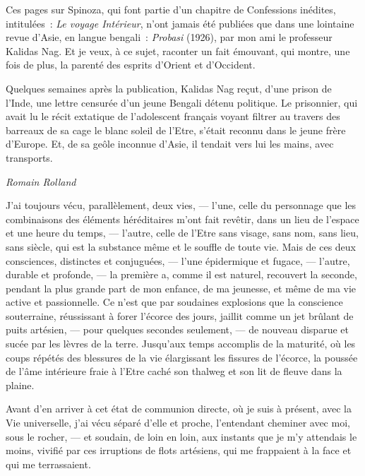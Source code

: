 

Ces pages sur Spinoza, qui font partie d'un chapitre de Confessions
inédites, intitulées~: \emph{Le voyage Intérieur}, n'ont jamais été
publiées que dans une lointaine revue d'Asie, en langue bengali~:
\emph{Probasi} (1926), par mon ami le professeur Kalidas Nag. Et je
veux, à ce sujet, raconter un fait émouvant, qui montre, une fois de
plus, la parenté des esprits d'Orient et d'Occident.

Quelques semaines après la publication, Kalidas Nag reçut, d'une prison
de l'Inde, une lettre censurée d'un jeune Bengali détenu politique. Le
prisonnier, qui avait lu le récit extatique de l'adolescent français
voyant filtrer au travers des barreaux de sa cage le blanc soleil de
l'Etre, s'était reconnu dans le jeune frère d'Europe. Et, de sa geôle
inconnue d'Asie, il tendait vers lui les mains, avec transports.

\begin{flushright}
\emph{Romain Rolland}
\end{flushright}

\pagebreak
\thispagestyle{empty}
\movetooddpage

J'ai toujours vécu, parallèlement, deux vies, --- l'une, celle du
personnage que les combinaisons des éléments héréditaires m'ont fait
revêtir, dans un lieu de l'espace et une heure du temps, --- l'autre,
celle de l'Etre sans visage, sans nom, sans lieu, sans siècle, qui est
la substance même et le souffle de toute vie. Mais de ces deux
consciences, distinctes et conjuguées, --- l'une épidermique et fugace,
--- l'autre, durable et profonde, --- la première a, comme il est naturel,
recouvert la seconde, pendant la plus grande part de mon enfance, de ma
jeunesse, et même de ma vie active et passionnelle. Ce n'est que par
soudaines explosions que la conscience souterraine, réussissant à forer
l'écorce des jours, jaillit comme un jet brûlant de puits artésien, ---
pour quelques secondes seulement, --- de nouveau disparue et sucée par
les lèvres de la terre. Jusqu'aux temps accomplis de la maturité, où les
coups répétés des blessures de la vie élargissant les fissures de
l'écorce, la poussée de l'âme intérieure fraie à l'Etre caché son
thalweg et son lit de fleuve dans la plaine.

Avant d'en arriver à cet état de communion directe, où je suis à
présent, avec la Vie universelle, j'ai vécu séparé d'elle et proche,
l'entendant cheminer avec moi, sous le rocher, --- et soudain, de loin en
loin, aux instants que je m'y attendais le moins, vivifié par ces
irruptions de flots artésiens, qui me frappaient à la face et qui me
terrassaient.

